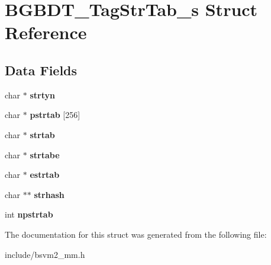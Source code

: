\hypertarget{structBGBDT__TagStrTab__s}{\section{B\-G\-B\-D\-T\-\_\-\-Tag\-Str\-Tab\-\_\-s Struct Reference}
\label{structBGBDT__TagStrTab__s}
}
\subsection*{Data Fields}
\begin{DoxyCompactItemize}
\item 
\hypertarget{structBGBDT__TagStrTab__s_a864325b0cb65619e9f85e8fb5335f35a}{char $\ast$ {\bfseries strtyn}}\label{structBGBDT__TagStrTab__s_a864325b0cb65619e9f85e8fb5335f35a}

\item 
\hypertarget{structBGBDT__TagStrTab__s_a0ad537d270190773f40480c03473836e}{char $\ast$ {\bfseries pstrtab} \mbox{[}256\mbox{]}}\label{structBGBDT__TagStrTab__s_a0ad537d270190773f40480c03473836e}

\item 
\hypertarget{structBGBDT__TagStrTab__s_a45f568bcabf986097eaced46cd50f0d9}{char $\ast$ {\bfseries strtab}}\label{structBGBDT__TagStrTab__s_a45f568bcabf986097eaced46cd50f0d9}

\item 
\hypertarget{structBGBDT__TagStrTab__s_af09621200ee67b95d6e2788f8d7dd390}{char $\ast$ {\bfseries strtabe}}\label{structBGBDT__TagStrTab__s_af09621200ee67b95d6e2788f8d7dd390}

\item 
\hypertarget{structBGBDT__TagStrTab__s_a7b44bf2dfd5195a4ba67ef0fd946f557}{char $\ast$ {\bfseries estrtab}}\label{structBGBDT__TagStrTab__s_a7b44bf2dfd5195a4ba67ef0fd946f557}

\item 
\hypertarget{structBGBDT__TagStrTab__s_a24ab5285b0915033c23f777d3a0c8817}{char $\ast$$\ast$ {\bfseries strhash}}\label{structBGBDT__TagStrTab__s_a24ab5285b0915033c23f777d3a0c8817}

\item 
\hypertarget{structBGBDT__TagStrTab__s_a3b4ffa0b830d2b0518157e00d88dee48}{int {\bfseries npstrtab}}\label{structBGBDT__TagStrTab__s_a3b4ffa0b830d2b0518157e00d88dee48}

\end{DoxyCompactItemize}


The documentation for this struct was generated from the following file\-:\begin{DoxyCompactItemize}
\item 
include/bsvm2\-\_\-mm.\-h\end{DoxyCompactItemize}
